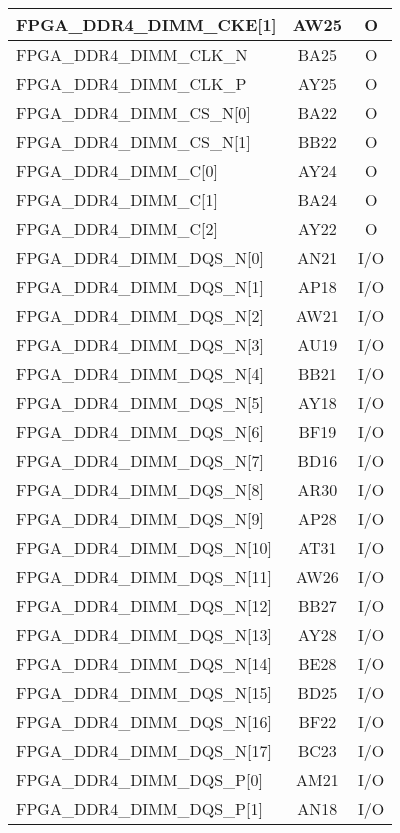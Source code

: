 \begin{longtable}[l]{| l | c | c |}
  FPGA\_DDR4\_DIMM\_CKE[1]     & AW25 & O   \\ \hline
  FPGA\_DDR4\_DIMM\_CLK\_N     & BA25 & O   \\ \hline
  FPGA\_DDR4\_DIMM\_CLK\_P     & AY25 & O   \\ \hline
  FPGA\_DDR4\_DIMM\_CS\_N[0]   & BA22 & O   \\ \hline
  FPGA\_DDR4\_DIMM\_CS\_N[1]   & BB22 & O   \\ \hline
  FPGA\_DDR4\_DIMM\_C[0]       & AY24 & O   \\ \hline
  FPGA\_DDR4\_DIMM\_C[1]       & BA24 & O   \\ \hline
  FPGA\_DDR4\_DIMM\_C[2]       & AY22 & O   \\ \hline
  FPGA\_DDR4\_DIMM\_DQS\_N[0]  & AN21 & I/O \\ \hline
  FPGA\_DDR4\_DIMM\_DQS\_N[1]  & AP18 & I/O \\ \hline
  FPGA\_DDR4\_DIMM\_DQS\_N[2]  & AW21 & I/O \\ \hline
  FPGA\_DDR4\_DIMM\_DQS\_N[3]  & AU19 & I/O \\ \hline
  FPGA\_DDR4\_DIMM\_DQS\_N[4]  & BB21 & I/O \\ \hline
  FPGA\_DDR4\_DIMM\_DQS\_N[5]  & AY18 & I/O \\ \hline
  FPGA\_DDR4\_DIMM\_DQS\_N[6]  & BF19 & I/O \\ \hline
  FPGA\_DDR4\_DIMM\_DQS\_N[7]  & BD16 & I/O \\ \hline
  FPGA\_DDR4\_DIMM\_DQS\_N[8]  & AR30 & I/O \\ \hline
  FPGA\_DDR4\_DIMM\_DQS\_N[9]  & AP28 & I/O \\ \hline
  FPGA\_DDR4\_DIMM\_DQS\_N[10] & AT31 & I/O \\ \hline
  FPGA\_DDR4\_DIMM\_DQS\_N[11] & AW26 & I/O \\ \hline
  FPGA\_DDR4\_DIMM\_DQS\_N[12] & BB27 & I/O \\ \hline
  FPGA\_DDR4\_DIMM\_DQS\_N[13] & AY28 & I/O \\ \hline
  FPGA\_DDR4\_DIMM\_DQS\_N[14] & BE28 & I/O \\ \hline
  FPGA\_DDR4\_DIMM\_DQS\_N[15] & BD25 & I/O \\ \hline
  FPGA\_DDR4\_DIMM\_DQS\_N[16] & BF22 & I/O \\ \hline
  FPGA\_DDR4\_DIMM\_DQS\_N[17] & BC23 & I/O \\ \hline
  FPGA\_DDR4\_DIMM\_DQS\_P[0]  & AM21 & I/O \\ \hline
  FPGA\_DDR4\_DIMM\_DQS\_P[1]  & AN18 & I/O \\ \hline

\end{longtable}
